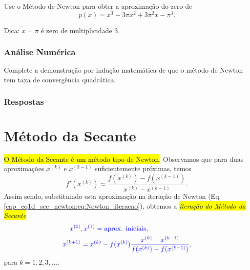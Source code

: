 \begin{exer}
  Use o Método de Newton para obter a aproximação do zero de
  \begin{equation}
    p(x) = x^3 - 3\pi x^2 + 3\pi^2 x - \pi^3.
  \end{equation}
\end{exer}
\begin{resp}
  Dica: $x=\pi$ é zero de multiplicidade 3.
\end{resp}

\subsubsection{Análise Numérica}

\begin{exer}\label{ex:Newton_analise_conv}
  Complete a demonstração por indução matemática de que o método de Newton tem taxa de convergência quadrática.
\end{exer}

\ifisbook
\subsubsection{Respostas}
\shipoutAnswer
\fi


\section{Método da Secante}\label{cap_eq1d_sec_secante}

\hl{O Método da Secante é um método tipo de Newton}. Observamos que para duas aproximações $x^{(k)}$ e $x^{(k-1)}$ suficientemente próximas, temos
\begin{equation}
  f'(x^{(k)}) \approx \frac{f(x^{(k)})-f(x^{(k-1)})}{x^{(k)}-x^{(k-1)}}.
\end{equation}
Assim sendo, substituindo esta aproximação na iteração de Newton (Eq. \eqref{cap_eq1d_sec_newton:eq:Newton_iteracao}), obtemos a \hl{\emph{iteração do Método da Secante}}
\begin{subequations}\label{cap_eq1d_sec_secante:eq:iter_secante}\hleq
  \begin{align}
    x^{(0)}&, x^{(1)} = \text{aprox. iniciais},\\
    x^{(k+1)} &= x^{(k)} - f(x^{(k)})\frac{x^{(k)}-x^{(k-1)}}{f(x^{(k)})-f(x^{(k-1)})},
  \end{align}
\end{subequations}
para $k=1, 2, 3, \ldots$.

